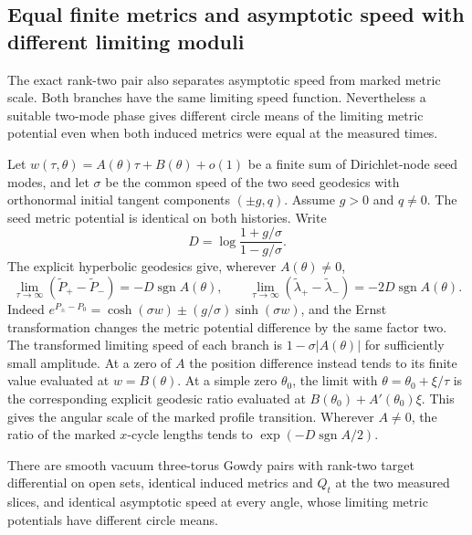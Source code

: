 \subsection{Equal finite metrics and asymptotic speed with different limiting moduli}
\label{sec:same-speed-different-modulus}

The exact rank-two pair also separates asymptotic speed
from marked metric scale. Both branches have the same
limiting speed function. Nevertheless a suitable two-mode
phase gives different circle means of the limiting
metric potential even when both induced metrics
were equal at the measured times.

Let $w(\tau,\theta)=A(\theta)\tau+B(\theta)+o(1)$ be
a finite sum of Dirichlet-node seed modes, and let
$\sigma$ be the common speed of the two seed geodesics
with orthonormal initial tangent components $(\pm g,q)$.
Assume $g>0$ and $q\ne0$.
The seed metric potential is identical on both histories.
Write
\[
 D=\log\frac{1+g/\sigma}{1-g/\sigma}.
\]
The explicit hyperbolic geodesics give, wherever
$A(\theta)\ne0$,
\[
 \lim_{\tau\to\infty}
     (\widetilde P_+-\widetilde P_-)
      =-D\operatorname{sgn} A(\theta),\qquad
 \lim_{\tau\to\infty}
     (\widetilde\lambda_+-\widetilde\lambda_-)
      =-2D\operatorname{sgn} A(\theta).
\]
Indeed $e^{P_\pm-P_0}
=\cosh(\sigma w)\pm(g/\sigma)\sinh(\sigma w)$,
and the Ernst transformation changes the metric
potential difference by the same factor two.
The transformed limiting speed of each branch is
$1-\sigma|A(\theta)|$ for sufficiently small amplitude.
At a zero of $A$ the position difference instead tends
to its finite value evaluated at $w=B(\theta)$.
At a simple zero $\theta_0$, the limit with
$\theta=\theta_0+\xi/\tau$ is the corresponding
explicit geodesic ratio evaluated at
$B(\theta_0)+A'(\theta_0)\xi$.
This gives the angular scale of the marked profile
transition. Wherever $A\ne0$, the ratio of the marked
$x$-cycle lengths tends to
$\exp(-D\operatorname{sgn} A/2)$.

\begin{proposition}
\label{prop:same-speed-different-modulus}
There are smooth vacuum three-torus Gowdy pairs with
rank-two target differential on open sets, identical
induced metrics and $Q_t$ at the two measured slices,
and identical asymptotic speed at every angle, whose
limiting metric potentials have different circle means.
\end{proposition}

